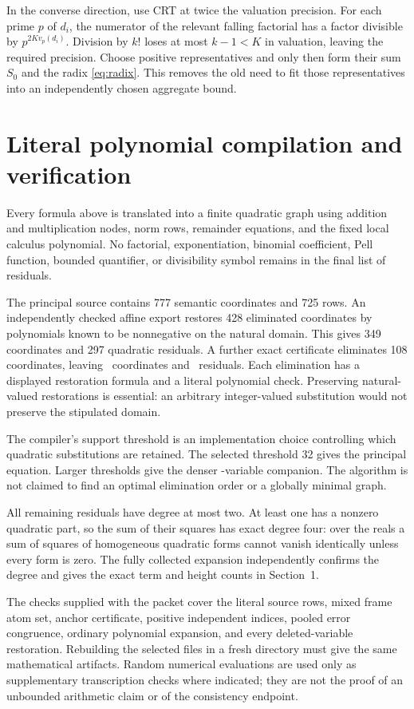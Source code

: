 \documentclass[11pt,letterpaper]{article}
\theoremstyle{remark}\newtheorem{remark}[theorem]{Remark}
\begin{document}
In the converse direction, use CRT at twice the valuation precision.
For each prime $p$ of $d_i$, the numerator of the relevant falling
factorial has a factor divisible by $p^{2K v_p(d_i)}$.  Division by $k!$
loses at most $k-1<K$ in valuation, leaving the required precision.
Choose positive representatives and only then form their sum $S_0$ and
the radix \eqref{eq:radix}.  This removes the old need to fit those
representatives into an independently chosen aggregate bound.

\section{Literal polynomial compilation and verification}

Every formula above is translated into a finite quadratic graph using
addition and multiplication nodes, norm rows, remainder equations, and
the fixed local calculus polynomial.  No factorial, exponentiation,
binomial coefficient, Pell function, bounded quantifier, or divisibility
symbol remains in the final list of residuals.

The principal source contains 777 semantic coordinates and 725 rows.
An independently checked affine export restores 428 eliminated coordinates
by polynomials known to be nonnegative on the natural domain.  This gives
349 coordinates and 297 quadratic residuals.  A further exact certificate
eliminates 108 coordinates, leaving \MainVars\ coordinates and \MainRows\
residuals.  Each elimination has a displayed restoration formula and a
literal polynomial check.  Preserving natural-valued restorations is
essential: an arbitrary integer-valued substitution would not preserve
the stipulated domain.

The compiler's support threshold is an implementation choice controlling
which quadratic substitutions are retained.  The selected threshold 32
gives the principal equation.  Larger thresholds give the denser
\DenseVars-variable companion.  The algorithm is not claimed to find an
optimal elimination order or a globally minimal graph.

All remaining residuals have degree at most two.  At least one has a
nonzero quadratic part, so the sum of their squares has exact degree four:
over the reals a sum of squares of homogeneous quadratic forms cannot
vanish identically unless every form is zero.  The fully collected
expansion independently confirms the degree and gives the exact term
and height counts in Section~1.

The checks supplied with the packet cover the literal source rows, mixed
frame atom set, anchor certificate, positive independent indices, pooled
error congruence, ordinary polynomial expansion, and every deleted-variable
restoration.  Rebuilding the selected files in a fresh directory must give
the same mathematical artifacts.  Random numerical evaluations are used
only as supplementary transcription checks where indicated; they are not
the proof of an unbounded arithmetic claim or of the consistency endpoint.
\end{document}
